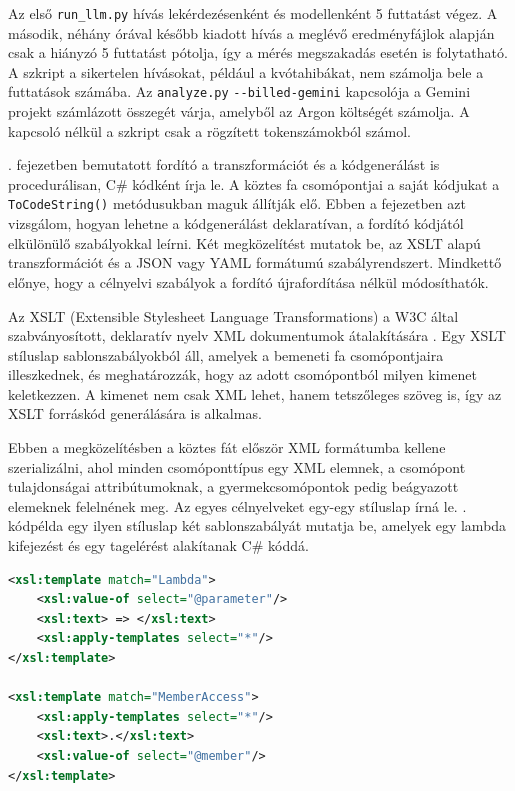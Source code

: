 Az első \texttt{run\_llm.py} hívás lekérdezésenként és modellenként 5 futtatást végez. A második, néhány órával később kiadott hívás a meglévő eredményfájlok alapján csak a hiányzó 5 futtatást pótolja, így a mérés megszakadás esetén is folytatható. A szkript a sikertelen hívásokat, például a kvótahibákat, nem számolja bele a futtatások számába. Az \texttt{analyze.py} \texttt{-{}-billed-gemini} kapcsolója a Gemini projekt számlázott összegét várja, amelyből az Argon költségét számolja. A kapcsoló nélkül a szkript csak a rögzített tokenszámokból számol.

\label{chap:deklarativ}

. fejezetben bemutatott fordító a transzformációt és a kódgenerálást is procedurálisan, C\# kódként írja le. A köztes fa csomópontjai a saját kódjukat a \texttt{ToCodeString()} metódusukban maguk állítják elő. Ebben a fejezetben azt vizsgálom, hogyan lehetne a kódgenerálást deklaratívan, a fordító kódjától elkülönülő szabályokkal leírni. Két megközelítést mutatok be, az XSLT alapú transzformációt és a JSON vagy YAML formátumú szabályrendszert. Mindkettő előnye, hogy a célnyelvi szabályok a fordító újrafordítása nélkül módosíthatók.


Az XSLT (Extensible Stylesheet Language Transformations) a W3C által szabványosított, deklaratív nyelv XML dokumentumok átalakítására \cite{w3c1999xslt}. Egy XSLT stíluslap sablonszabályokból áll, amelyek a bemeneti fa csomópontjaira illeszkednek, és meghatározzák, hogy az adott csomópontból milyen kimenet keletkezzen. A kimenet nem csak XML lehet, hanem tetszőleges szöveg is, így az XSLT forráskód generálására is alkalmas.

Ebben a megközelítésben a köztes fát először XML formátumba kellene szerializálni, ahol minden csomóponttípus egy XML elemnek, a csomópont tulajdonságai attribútumoknak, a gyermekcsomópontok pedig beágyazott elemeknek felelnének meg. Az egyes célnyelveket egy-egy stíluslap írná le. . kódpélda egy ilyen stíluslap két sablonszabályát mutatja be, amelyek egy lambda kifejezést és egy tagelérést alakítanak C\# kóddá.

\begin{lstlisting}[language=XML, caption={XSLT sablonszabályok egy lambda kifejezés és egy tagelérés generálására}, label={lst:xslt}]
<xsl:template match="Lambda">
	<xsl:value-of select="@parameter"/>
	<xsl:text> => </xsl:text>
	<xsl:apply-templates select="*"/>
</xsl:template>
	
<xsl:template match="MemberAccess">
	<xsl:apply-templates select="*"/>
	<xsl:text>.</xsl:text>
	<xsl:value-of select="@member"/>
</xsl:template>
\end{lstlisting}

